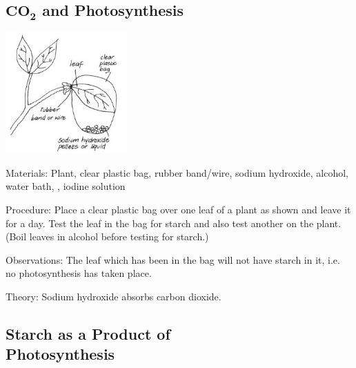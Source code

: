 \begin{multicols}{2}
\subsection{$\mathrm{\textbf{C}\textbf{O}_\textbf{2}}$ and Photosynthesis} %

\begin{center}
\includegraphics[width=0.35\textwidth]{./img/vso/co2-photo.jpg}
\end{center}

\begin{description*}
\item[Materials:]{Plant, clear plastic bag, rubber band/wire, sodium hydroxide, alcohol, water bath, , iodine solution}
\item[Procedure:]{Place a clear plastic bag over one
leaf of a plant as shown and leave
it for a day. Test the leaf in the
bag for starch and also test
another on the plant. (Boil leaves
in alcohol before testing for
starch.) }
\item[Observations:]{The leaf which has been
in the bag will not have starch in
it, i.e. no photosynthesis has
taken place.}
\item[Theory:]{Sodium hydroxide absorbs carbon dioxide.}
\end{description*}

\columnbreak

\subsection{Starch as a Product of \hfill \\ Photosynthesis} %


\end{multicols}
